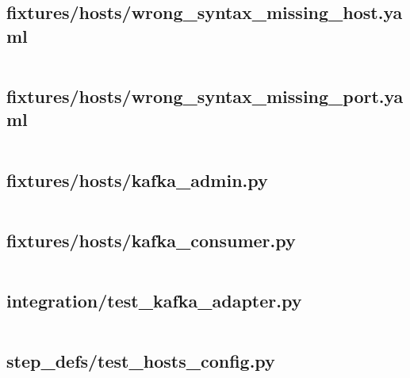 \documentclass[10pt , a4paper]{report}
\newenvironment{code}{\captionsetup{type=listing}}{}
\begin{document}
\subsection{fixtures/hosts/wrong\_syntax\_missing\_host.yaml}
\begin{code}
  \inputminted[fontsize=\small]{YAML}{../tests/fixtures/hosts/wrong_syntax_missing_host.yaml}
\end{code}

\subsection{fixtures/hosts/wrong\_syntax\_missing\_port.yaml}
\begin{code}
  \inputminted[fontsize=\small]{YAML}{../tests/fixtures/hosts/wrong_syntax_missing_port.yaml}
\end{code}

\subsection{fixtures/hosts/kafka\_admin.py}
\begin{code}
  \inputminted[fontsize=\small]{Python}{../tests/fixtures/kafka_admin.py}
\end{code}

\subsection{fixtures/hosts/kafka\_consumer.py}
\begin{code}
  \inputminted[fontsize=\small]{Python}{../tests/fixtures/kafka_consumer.py}
\end{code}

\subsection{integration/test\_kafka\_adapter.py}
\begin{code}
  \inputminted[fontsize=\small]{Python}{../tests/integration/test_kafka_adapter.py}
\end{code}

\subsection{step\_defs/test\_hosts\_config.py}
\begin{code}
  \inputminted[fontsize=\small]{Python}{../tests/step_defs/test_hosts_config.py}
\end{code}
\end{document}
